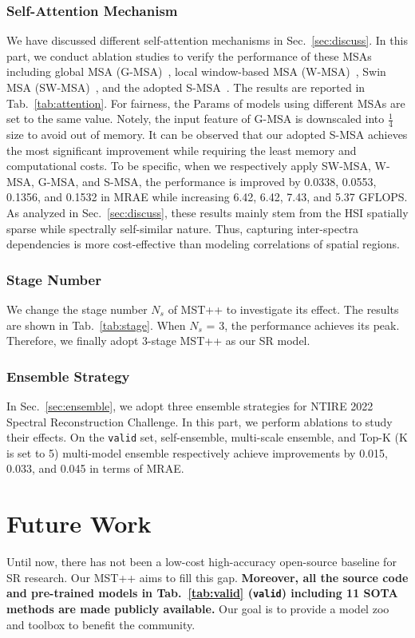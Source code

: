 \documentclass[10pt,twocolumn,letterpaper]{article}
\begin{document}
\subsubsection{Self-Attention Mechanism}
We have discussed different self-attention mechanisms in Sec.~\ref{sec:discuss}. In this part,  we conduct ablation studies to verify the performance of these MSAs including global MSA (G-MSA)~\cite{global_msa}, local window-based MSA (W-MSA)~\cite{liu2021swin}, Swin MSA (SW-MSA)~\cite{liu2021swin}, and the adopted S-MSA~\cite{mst}. The results are reported in Tab.~\ref{tab:attention}. For fairness, the Params of models using different MSAs are set to the same value. Notely, the input feature of G-MSA is downscaled  into $\frac{1}{4}$ size to avoid out of memory.  It can be observed that our adopted S-MSA achieves the most significant improvement while requiring the least memory and computational costs. To be specific, when we respectively apply SW-MSA, W-MSA, G-MSA, and S-MSA, the performance is improved by 0.0338, 0.0553, 0.1356, and 0.1532 in MRAE while increasing 6.42, 6.42, 7.43, and 5.37 GFLOPS.  As analyzed in Sec.~\ref{sec:discuss}, these results mainly stem from the HSI spatially sparse while spectrally self-similar nature. Thus, capturing inter-spectra dependencies is more cost-effective than modeling correlations of spatial regions. 

\subsubsection{Stage Number}
We change the stage number $N_s$ of MST++ to investigate its effect. The results are shown in Tab.~\ref{tab:stage}. When $N_s$ = 3, the performance achieves its peak. Therefore, we finally adopt 3-stage MST++ as our SR model.


\subsubsection{Ensemble Strategy}
In Sec.~\ref{sec:ensemble}, we  adopt three ensemble strategies for NTIRE 2022 Spectral Reconstruction Challenge. In this part, we perform ablations to study their effects. On the \texttt{valid} set, self-ensemble, multi-scale ensemble, and Top-K (K is set to 5) multi-model ensemble respectively achieve improvements by 0.015, 0.033, and 0.045 in terms of MRAE. 

\section{Future Work}
Until now, there has not been a low-cost high-accuracy open-source baseline for SR research. Our MST++ aims to fill this gap. \textbf{Moreover, all the source code and pre-trained models in Tab.~\ref{tab:valid} (\texttt{valid}) including 11 SOTA methods are made publicly available.} Our goal is to provide a model zoo and toolbox to benefit the community.
\end{document}
